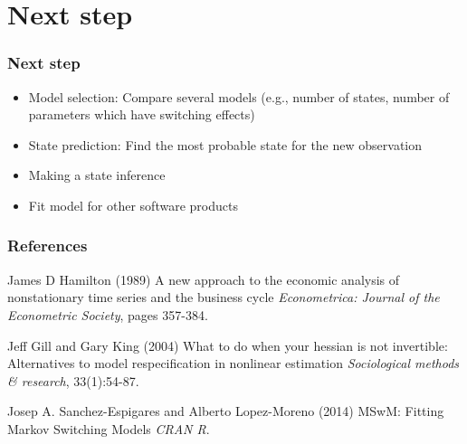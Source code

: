 \documentclass{beamer}
\begin{document}
\section{Next step}
\begin{frame}
\frametitle{Next step}
\begin{itemize}
	\setlength\itemsep{1em}
	\item Model selection: Compare several models (e.g., number of states, number of parameters which have switching effects)
	\item State prediction: Find the most probable state for the new observation
	\item Making a state inference
	\item Fit model for other software products

\end{itemize}
\end{frame}

\begin{frame}
\frametitle{References}
\footnotesize{
	\begin{thebibliography}{99} %
		 James D Hamilton (1989)
		\newblock A new approach to the economic analysis of nonstationary time series and the business cycle
		\newblock \emph{Econometrica: Journal of the Econometric Society}, pages 357-384.
	\end{thebibliography}
	\begin{thebibliography}{99} %
		 Jeff Gill and Gary King (2004)
		\newblock What to do when your hessian is not invertible:
		Alternatives to model respecification in nonlinear estimation
		\newblock \emph{Sociological
			methods \& research}, 33(1):54-87.
	\end{thebibliography}
	\begin{thebibliography}{99} %
		 Josep A. Sanchez-Espigares and Alberto Lopez-Moreno (2014)
		\newblock MSwM: Fitting Markov Switching Models
		\newblock \emph{CRAN R}.
	\end{thebibliography}
}
\end{frame}
\end{document}
